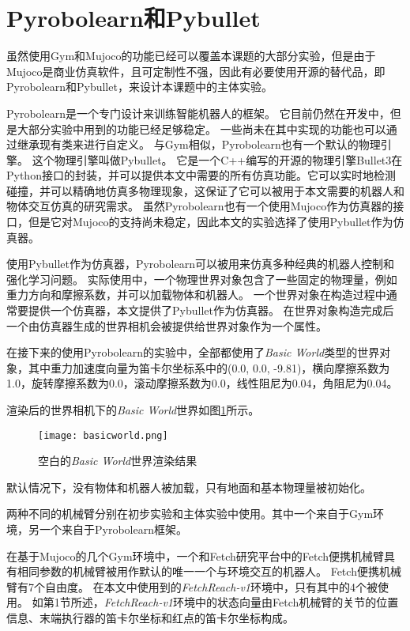 \section{Pyrobolearn和Pybullet}
虽然使用Gym和Mujoco的功能已经可以覆盖本课题的大部分实验，但是由于Mujoco是商业仿真软件，且可定制性不强，因此有必要使用开源的替代品，即Pyrobolearn和Pybullet，来设计本课题中的主体实验。

Pyrobolearn是一个专门设计来训练智能机器人的框架\cite{delhaisse2019pyrobolearn}。
它目前仍然在开发中，但是大部分实验中用到的功能已经足够稳定。
一些尚未在其中实现的功能也可以通过继承现有类来进行自定义。
与Gym相似，Pyrobolearn也有一个默认的物理引擎。
这个物理引擎叫做Pybullet\cite{coumans2016pybullet}。
它是一个C++编写的开源的物理引擎Bullet3在Python接口的封装，并可以提供本文中需要的所有仿真功能。它可以实时地检测碰撞，并可以精确地仿真多物理现象，这保证了它可以被用于本文需要的机器人和物体交互仿真的研究需求。
虽然Pyrobolearn也有一个使用Mujoco作为仿真器的接口，但是它对Mujoco的支持尚未稳定，因此本文的实验选择了使用Pybullet作为仿真器。

使用Pybullet作为仿真器，Pyrobolearn可以被用来仿真多种经典的机器人控制和强化学习问题。
实际使用中，一个物理世界对象包含了一些固定的物理量，例如重力方向和摩擦系数，并可以加载物体和机器人。
一个世界对象在构造过程中通常要提供一个仿真器，本文提供了Pybullet作为仿真器。
在世界对象构造完成后一个由仿真器生成的世界相机会被提供给世界对象作为一个属性。

在接下来的使用Pyrobolearn的实验中，全部都使用了\emph{Basic World}类型的世界对象，其中重力加速度向量为笛卡尔坐标系中的(0.0, 0.0, -9.81)，横向摩擦系数为1.0，旋转摩擦系数为0.0，滚动摩擦系数为0.0，线性阻尼为0.04，角阻尼为0.04。

渲染后的世界相机下的\emph{Basic World}世界如图\ref{basicworld}所示。
    \begin{figure}[htpb]
        \centering
        \texttt{[image: basicworld.png]}
        \caption{空白的\emph{Basic World}世界渲染结果}
        \label{basicworld}
    \end{figure}
默认情况下，没有物体和机器人被加载，只有地面和基本物理量被初始化。

两种不同的机械臂分别在初步实验和主体实验中使用。其中一个来自于Gym环境，另一个来自于Pyrobolearn框架。

在基于Mujoco的几个Gym环境中，一个和Fetch研究平台中的Fetch便携机械臂具有相同参数的机械臂被用作默认的唯一一个与环境交互的机器人\cite{Wise2016FetchF}。
Fetch便携机械臂有7个自由度。
在本文中使用到的\emph{FetchReach-v1}环境中，只有其中的4个被使用。
如第1节所述，\emph{FetchReach-v1}环境中的状态向量由Fetch机械臂的关节的位置信息、末端执行器的笛卡尔坐标和红点的笛卡尔坐标构成。

